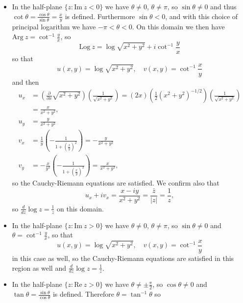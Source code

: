 \documentclass{article}
\begin{document}
\begin{Answer}
  \begin{itemize}
    \item{
      In the half-plane $\{ z : \mathrm{Im}~z < 0 \}$ we have
      $\theta \neq 0$, $\theta \neq \pi$, so $\sin \theta \neq 0$
      and thus
      $\cot \theta = \frac{\cos \theta}{\sin \theta} = \frac{x}{y}$ is
      defined. Furthermore $\sin \theta < 0$, and
      with this choice of principal logarithm we have
      $-\pi < \theta < 0$.
      On this domain we then have $\mathrm{Arg}~z = \cot^{-1} \frac{y}{x}$, so
      $$
      \mathrm{Log}~z = \log \sqrt{x^2 + y^2} + i \cot^{-1} \frac{y}{x}
      $$
      so that
      $$
      u(x, y) = \log \sqrt{x^2 + y^2}, \quad
      v(x, y) = \cot^{-1} \frac{x}{y}
      $$
      and then
      \begin{align*}
      u_x &= \left(\frac{\partial}{\partial x} \sqrt{x^2 + y^2}\right)
             \left(\frac{1}{\sqrt{x^2 + y^2}}\right)
           = (2x)\left(\frac{1}{2}(x^2 + y^2)^{-1/2}\right)
             \left(\frac{1}{\sqrt{x^2 + y^2}}\right) \\
          &= \frac{x}{x^2 + y^2}, \\
      u_y &= \frac{y}{x^2 + y^2} \\
      v_x &= \frac{1}{y}\left(-\frac{1}{1 + \left(\frac{x}{y}\right)^2}\right)
           = -\frac{y}{x^2 + y^2} \\
      v_y &= -\frac{x}{y^2}\left(-\frac{1}{1 + \left(\frac{x}{y}\right)^2}\right)
           = \frac{x}{x^2 + y^2},
      \end{align*}
      so the Cauchy-Riemann equations are satisfied.
      We confirm also that
      $$
        u_x + i v_x
      = \frac{x - iy}{x^2 + y^2}
      = \frac{\bar{z}}{|z|}
      = \frac{1}{z},
      $$
      so $\frac{d}{dz} \log z = \frac{1}{z}$ on this domain.
    }
    \item{
      In the half-plane $\{z : \mathrm{Im}~z > 0\}$ we have
      $\theta \neq 0$, $\theta \neq \pi$, so $\sin \theta \neq 0$ and
      $\theta = \cot^{-1} \frac{y}{x}$, so that
      $$
      u(x, y) = \log \sqrt{x^2 + y^2}, \quad
      v(x, y) = \cot^{-1} \frac{x}{y}
      $$
      in this case as well, so the Cauchy-Riemann
      equations are satisfied in this region as well and
      $\frac{d}{dz} \log z = \frac{1}{z}$.
    }
    \item{
      In the half-plane $\{z : \mathrm{Re}~z > 0\}$ we have
      $\theta \neq \pm \frac{\pi}{2}$, so $\cos \theta \neq 0$ and
      $\tan \theta = \frac{\sin \theta}{\cos \theta}$ is defined.
      Therefore $\theta = \tan^{-1} \theta$ so
}
\end{itemize}
\end{Answer}
\end{document}
